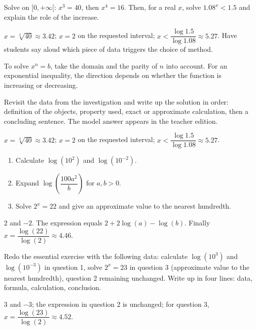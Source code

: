 \begin{activity}
Solve on $[0,+\infty[$: $x^3=40$, then $x^4=16$. Then, for a real $x$, solve $\num{1,08}^x<\num{1,5}$ and explain the role of the increase.

\end{activity}
\begin{solution}$x=\sqrt[3]{40}\approx\num{3,42}$; $x=2$ on the requested interval; $x<\dfrac{\log\num{1,5}}{\log\num{1,08}}\approx\num{5,27}$. Have students say aloud which piece of data triggers the choice of method.\end{solution}

\begin{summary}To solve $x^n=b$, take the domain and the parity of $n$ into account. For an exponential inequality, the direction depends on whether the function is increasing or decreasing.\end{summary}

\begin{example}
Revisit the data from the investigation and write up the solution in order: definition of the objects, property used, exact or approximate calculation, then a concluding sentence. The model answer appears in the teacher edition.
\end{example}
\begin{solution}$x=\sqrt[3]{40}\approx\num{3,42}$; $x=2$ on the requested interval; $x<\dfrac{\log\num{1,5}}{\log\num{1,08}}\approx\num{5,27}$.\end{solution}

\begin{exercise}[essential]
\begin{enumerate}\item Calculate $\log(10^2)$ and $\log(10^{-2})$.\item Expand $\log\!\left(\dfrac{100a^2}{b}\right)$ for $a,b>0$.\item Solve $2^x=22$ and give an approximate value to the nearest hundredth.\end{enumerate}
\end{exercise}
\begin{solution}$2$ and $-2$. The expression equals $2+2\log(a)-\log(b)$. Finally $x=\dfrac{\log(22)}{\log(2)}\approx\num{4,46}$.\end{solution}


\begin{homework}Redo the essential exercise with the following data: calculate $\log(10^{3})$ and $\log(10^{-3})$ in question 1, solve $2^x=23$ in question 3 (approximate value to the nearest hundredth), question 2 remaining unchanged. Write up in four lines: data, formula, calculation, conclusion.\end{homework}
\begin{solution}$3$ and $-3$; the expression in question 2 is unchanged; for question 3, $x=\dfrac{\log(23)}{\log(2)}\approx\num{4,52}$.\end{solution}


